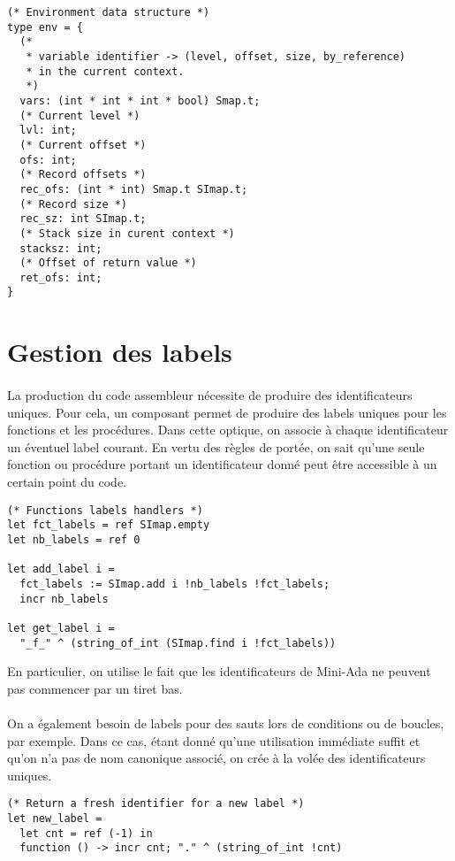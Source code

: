 \documentclass[a4paper,12pt]{article}
\begin{document}
\begin{lstlisting}
(* Environment data structure *)
type env = {
  (* 
   * variable identifier -> (level, offset, size, by_reference)
   * in the current context.
   *)
  vars: (int * int * int * bool) Smap.t;
  (* Current level *)
  lvl: int;
  (* Current offset *)
  ofs: int;
  (* Record offsets *)
  rec_ofs: (int * int) Smap.t SImap.t;
  (* Record size *)
  rec_sz: int SImap.t;
  (* Stack size in curent context *)
  stacksz: int;
  (* Offset of return value *) 
  ret_ofs: int;
}
\end{lstlisting}

\section{Gestion des labels}

\paragraph*{}
La production du code assembleur nécessite de produire des identificateurs uniques. Pour cela, un composant permet de
produire des labels uniques pour les fonctions et les procédures. Dans cette optique, on associe à chaque identificateur un
éventuel label courant. En vertu des règles de portée, on sait qu'une seule fonction ou procédure portant un identificateur
donné peut être accessible à un certain point du code.

\begin{lstlisting}
(* Functions labels handlers *)
let fct_labels = ref SImap.empty
let nb_labels = ref 0

let add_label i =
  fct_labels := SImap.add i !nb_labels !fct_labels;
  incr nb_labels

let get_label i =
  "_f_" ^ (string_of_int (SImap.find i !fct_labels))
\end{lstlisting}

En particulier, on utilise le fait que les identificateurs de Mini-Ada ne peuvent pas commencer par un tiret bas.

\paragraph*{}
On a également besoin de labels pour des sauts lors de conditions ou de boucles, par exemple. Dans ce cas, étant
donné qu'une utilisation immédiate suffit et qu'on n'a pas de nom canonique associé, on crée à la volée des
identificateurs uniques.

\begin{lstlisting}
(* Return a fresh identifier for a new label *)
let new_label =
  let cnt = ref (-1) in
  function () -> incr cnt; "." ^ (string_of_int !cnt)
\end{lstlisting}
\end{document}
